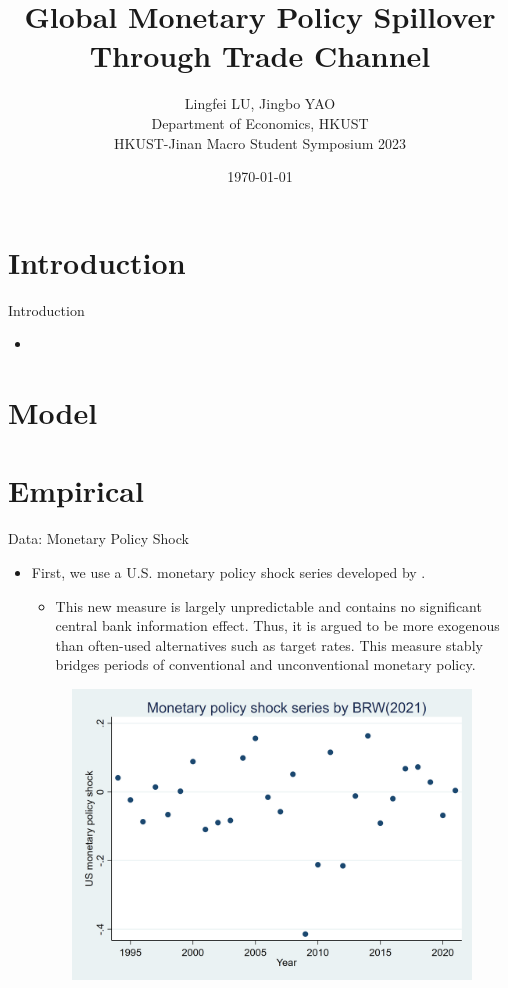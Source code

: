 \documentclass[10pt]{beamer}
\title[Monetary Policy Spillover Through Trade Channel]{Global Monetary Policy Spillover Through Trade Channel}
\author[Yao\&Lu (2023)]{\large Lingfei LU, Jingbo YAO \\ \vspace{0.5cm} Department of Economics, HKUST \\ \vspace{0.5cm} HKUST-Jinan Macro Student Symposium 2023}
\date{\today}
\begin{document}
	
    \begin{frame}[plain]
	\maketitle {}
    \end{frame}


\section{Introduction}

\begin{frame}{Introduction}
	\begin{itemize}
		\item 
	\end{itemize}
\end{frame}

\section{Model}

\section{Empirical}

\begin{frame}{Data: Monetary Policy Shock}
    \begin{itemize}
        \item First, we use a U.S. monetary policy shock series developed by \cite{brw2021}.
        \begin{itemize}
            \item This new measure is largely unpredictable and contains no significant central bank information effect. Thus, it is argued to be more exogenous than often-used alternatives such as target rates. This measure stably bridges periods of conventional and unconventional monetary policy.
        \end{itemize}
        \begin{figure}[htbp]
		\centering
		\includegraphics[width=0.9\columnwidth]{latex/BRW.png}
		\label{sum.brw}
	\end{figure}
    \end{itemize}
\end{frame}
\end{document}
